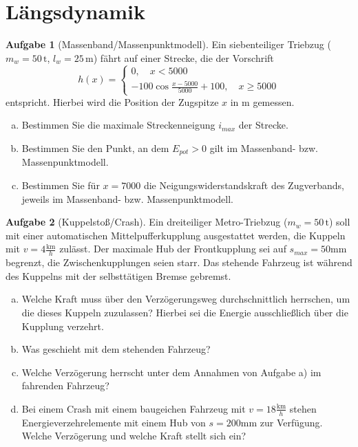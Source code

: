 \documentclass[10pt,a4paper,headsepline,smallheadings]{scrartcl}
\theoremstyle{definition}
\newtheorem{aufgabe}{Aufgabe}
\begin{document}
\section*{L\"angsdynamik}

\begin{aufgabe}[Massenband/Massenpunktmodell]
Ein siebenteiliger Triebzug ($m_{w} = 50 \, \mathrm{t}$, $l_{w} = 25 \, \mathrm{m}$) f\"ahrt auf einer Strecke, die der Vorschrift 
 \begin{equation*}
h(x) = 
\begin{cases}
 0, \quad x < 5000 \\
 - 100 \cos \frac{x-5000}{5000} + 100, \quad x \geq 5000
\end{cases}
\end{equation*}
entspricht. Hierbei wird die Position der Zugspitze $x$ in $\mathrm{m}$ gemessen.
\begin{enumerate}[a)]
\item Bestimmen Sie die maximale Streckenneigung $i_{max}$ der Strecke.
\item Bestimmen Sie den Punkt, an dem $E_{pot} > 0$ gilt im Massenband- bzw. Massenpunktmodell.
\item Bestimmen Sie f\"ur $x = 7000$ die Neigungswiderstandskraft des Zugverbands, jeweils im Massenband- bzw. Massenpunktmodell.
\end{enumerate}

\end{aufgabe}
\vspace{.5cm}
\begin{aufgabe}[Kuppelsto{\ss}/Crash]
Ein dreiteiliger Metro-Triebzug ($m_{w} = 50 \, \mathrm{t}$) soll mit einer automatischen Mittelpufferkupplung ausgestattet werden, die Kuppeln mit $v = 4 \frac{\mathrm{km}}{{h}}$ zul\"asst. Der maximale Hub der Frontkupplung sei auf $s_{max} = 50 \mathrm{mm}$ begrenzt, die Zwischenkupplungen seien starr. Das stehende Fahrzeug ist w\"ahrend des Kuppelns mit der selbstt\"atigen Bremse gebremst.
\begin{enumerate}[a)]
\item Welche Kraft muss \"uber den Verz\"ogerungsweg durchschnittlich herrschen, um die dieses Kuppeln zuzulassen? Hierbei sei die Energie ausschlie{\ss}lich \"uber die Kupplung verzehrt.
\item Was geschieht mit dem stehenden Fahrzeug?
\item Welche Verz\"ogerung herrscht unter dem Annahmen von Aufgabe a) im fahrenden Fahrzeug?
\item Bei einem Crash mit einem baugeichen Fahrzeug mit $v = 18 \frac{\mathrm{km}}{{h}}$ stehen Energieverzehrelemente mit einem Hub von $s = 200 \mathrm{mm}$ zur Verf\"ugung. Welche Verz\"ogerung und welche Kraft stellt sich ein?
\end{enumerate}
\end{aufgabe}
\end{document}
